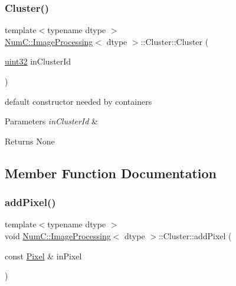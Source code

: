 \subsubsection{\texorpdfstring{Cluster()}{Cluster()}}
{\footnotesize\ttfamily template$<$typename dtype $>$ \\
\mbox{\hyperlink{class_num_c_1_1_image_processing}{Num\+C\+::\+Image\+Processing}}$<$ dtype $>$\+::Cluster\+::\+Cluster (\begin{DoxyParamCaption}\item[{\mbox{\hyperlink{namespace_num_c_ae685802ca6d3035f2b400b081e3953fa}{uint32}}}]{in\+Cluster\+Id }\end{DoxyParamCaption})\hspace{0.3cm}{\ttfamily [inline]}}

default constructor needed by containers


\begin{DoxyParams}{Parameters}
{\em in\+Cluster\+Id} & \\
\hline
\end{DoxyParams}
\begin{DoxyReturn}{Returns}
None 
\end{DoxyReturn}


\subsection{Member Function Documentation}
\mbox{\label{class_num_c_1_1_image_processing_1_1_cluster_a7a36d85bbc283a7a134d75a5400f8190}} 
\subsubsection{\texorpdfstring{add\+Pixel()}{addPixel()}}
{\footnotesize\ttfamily template$<$typename dtype $>$ \\
void \mbox{\hyperlink{class_num_c_1_1_image_processing}{Num\+C\+::\+Image\+Processing}}$<$ dtype $>$\+::Cluster\+::add\+Pixel (\begin{DoxyParamCaption}\item[{const \mbox{\hyperlink{class_num_c_1_1_image_processing_1_1_pixel}{Pixel}} \&}]{in\+Pixel }\end{DoxyParamCaption})\hspace{0.3cm}{\ttfamily [inline]}}

